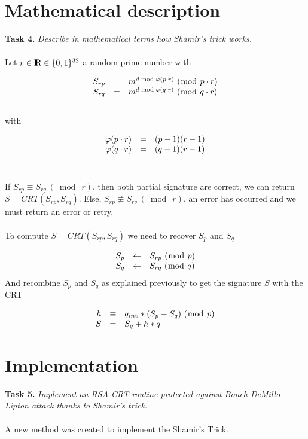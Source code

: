 \documentclass[a4paper]{report}
\def\R{\textrm{I\kern-0.21emR}}
\begin{document}
\section{Mathematical description}
\textbf{Task 4.} \textit{Describe in mathematical terms how Shamir’s trick works.}
\\ \\
Let $r \in \R \in \{0,1\}^{32}$ a random prime number with

\[
\left .
   \begin{array}{r c l}
      S_{rp}  & =  & m^{d\bmod\varphi (p\cdot r)}\ (\bmod\ p\cdot r) \\
      S_{rq}  & =  & m^{d\bmod\varphi (q\cdot r)}\ (\bmod\ q\cdot r)
   \end{array}
\right .
\]
\ 
\\
with

\[
\left .
   \begin{array}{r c l}
      \varphi (p\cdot r)  & =  & (p-1)(r-1) \\
      \varphi (q\cdot r)  & =  & (q-1)(r-1)
   \end{array}
\right .
\]
\ 

If $S_{rp} \equiv S_{rq}\ (\bmod\ r)$, then both partial signature are correct, we can return $S = CRT(S_{rp}, S_{rq})$. Else, $S_{rp} \not\equiv S_{rq}\ (\bmod\ r)$, an error has occurred and we must return an error or retry.
\\ \\
To compute $S = CRT(S_{rp}, S_{rq})$ we need to recover $S_{p}$ and $S_{q}$

\[
\left .
   \begin{array}{r c l}
      S_{p}  & \leftarrow  & S_{rp}\ (\bmod\ p) \\
      S_{q}  & \leftarrow  & S_{rq}\ (\bmod\ q)
   \end{array}
\right .
\]
And recombine $S_{p}$ and $S_{q}$ as explained previously to get the signature $S$ with the CRT

\[
\left .
   \begin{array}{r c l}
      h         & \equiv       & q_{inv} * (S_p - S_q)\ (\bmod\ p) \\
      S         & =              & S_q + h*q 
   \end{array}
\right .
\]

\newpage
\section{Implementation}
\textbf{Task 5.} \textit{Implement an RSA-CRT routine protected against Boneh-DeMillo-Lipton attack thanks to Shamir’s trick.}
\\ \\
A new method was created to implement the Shamir's Trick.
\end{document}

